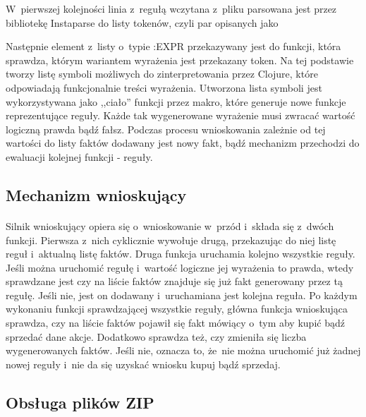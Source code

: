 W~pierwszej kolejności linia z~regułą wczytana z~pliku parsowana jest przez bibliotekę Instaparse\cite{instaparse} do listy tokenów, czyli par opisanych jako
\begin{figure}[h]
\end{figure}

Następnie element z~listy o~typie :EXPR przekazywany jest do funkcji, która sprawdza, którym wariantem wyrażenia jest przekazany token. Na tej podstawie tworzy listę symboli możliwych do zinterpretowania przez Clojure, które odpowiadają funkcjonalnie treści wyrażenia. Utworzona lista symboli jest wykorzystywana jako ,,ciało'' funkcji przez makro, które generuje nowe funkcje reprezentujące reguły. Każde tak wygenerowane wyrażenie musi zwracać wartość logiczną prawda bądź fałsz. Podczas procesu wnioskowania zależnie od tej wartości do listy faktów dodawany jest nowy fakt, bądź mechanizm przechodzi do ewaluacji kolejnej funkcji - reguły.

\subsection{Mechanizm wnioskujący}

\paragraph{}
Silnik wnioskujący opiera się o~wnioskowanie w~przód i~składa się z~dwóch funkcji. Pierwsza z~nich cyklicznie wywołuje drugą, przekazując do niej listę reguł i~aktualną listę faktów. Druga funkcja uruchamia kolejno wszystkie reguły. Jeśli można uruchomić regułę i~wartość logiczne jej wyrażenia to prawda, wtedy sprawdzane jest czy na liście faktów znajduje się już fakt generowany przez tą regułę. Jeśli nie, jest on dodawany i~uruchamiana jest kolejna reguła. Po każdym wykonaniu funkcji sprawdzającej wszystkie reguły, główna funkcja wnioskująca sprawdza, czy na liście faktów pojawił się fakt mówiący o~tym aby kupić bądź sprzedać dane akcje. Dodatkowo sprawdza też, czy zmieniła się liczba wygenerowanych faktów. Jeśli nie, oznacza to, że~nie można uruchomić już żadnej nowej reguły i~nie da się uzyskać wniosku kupuj bądź sprzedaj.

\subsection{Obsługa plików ZIP}

